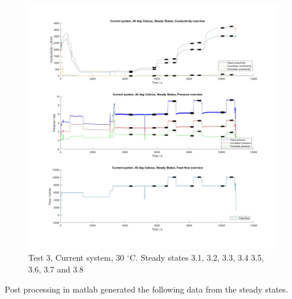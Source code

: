 \begin{figure}[H]
    \centering
    \includegraphics[width=1.1\textwidth]{overview40}
    \caption{Test 3, Current system, 30 $^{\circ}$C. Steady states 3.1, 3.2, 3.3, 3.4 3.5, 3.6, 3.7 and 3.8}
    \label{fig:overw40}
\end{figure}

\newpage

Post processing in matlab generated the following data from the steady states.

